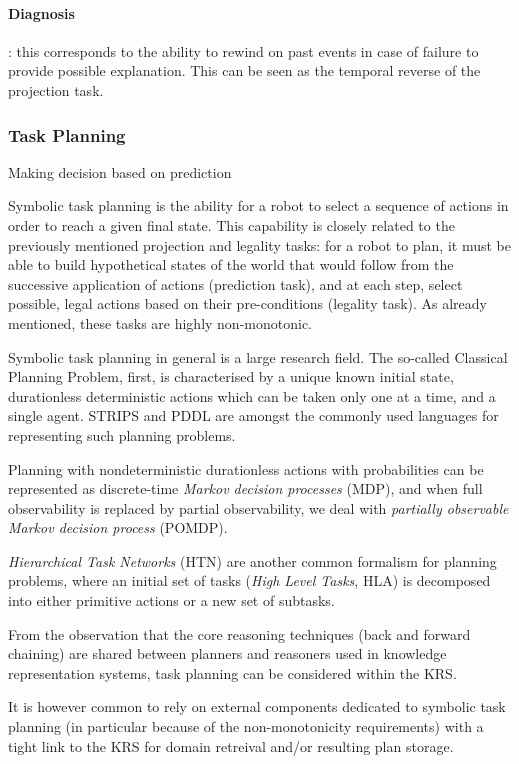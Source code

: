\paragraph{Diagnosis}: this corresponds to the ability to rewind on past events
in case of failure to provide possible explanation. This can be seen as the
temporal reverse of the projection task.

\subsubsection{Task Planning}
\label{sect|planning}

Making decision based on prediction

Symbolic task planning is the ability for a robot to select a sequence of
actions in order to reach a given final state. This capability is closely
related to the previously mentioned projection and legality tasks: for a robot
to plan, it must be able to build hypothetical states of the world that would
follow from the successive application of actions (prediction task), and at
each step, select possible, legal actions based on their pre-conditions
(legality task). As already mentioned, these tasks are highly non-monotonic.


Symbolic task planning in general is a large research
field\cite{Russell2009planning}. The so-called Classical Planning Problem,
first, is characterised by a unique known initial state, durationless
deterministic actions which can be taken only one at a time, and a single
agent. STRIPS and PDDL are amongst the commonly used languages for representing
such planning problems.

Planning with nondeterministic durationless actions with probabilities can be
represented as discrete-time \emph{Markov decision processes} (MDP), and when
full observability is replaced by partial observability, we deal with
\emph{partially observable Markov decision process} (POMDP).

\emph{Hierarchical Task Networks} (HTN) are another common formalism for
planning problems, where an initial set of tasks (\emph{High Level Tasks}, HLA)
is decomposed into either primitive actions or a new set of subtasks.

From the observation that the core reasoning techniques (back and forward
chaining) are shared between planners and reasoners used in knowledge
representation systems, task planning can be considered within the KRS.

It is however common to rely on external components dedicated to symbolic task
planning (in particular because of the non-monotonicity requirements) with a
tight link to the KRS for domain retreival and/or resulting plan storage.

